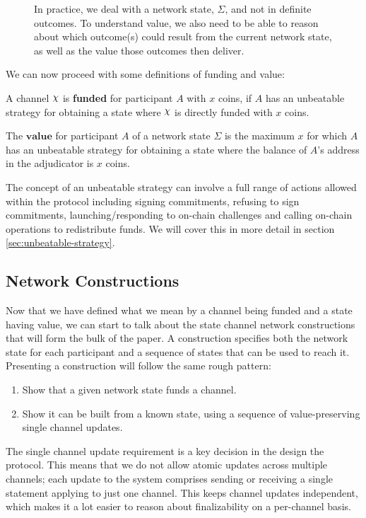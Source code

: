 \begin{figure}[h]\centering
  \makebox[\textwidth][c]{}
  \caption{
    In practice, we deal with a network state, $\Sigma$, and not in definite outcomes.
    To understand value, we also need to be able to reason about which outcome(s) could result from the current network state, as well as the value those outcomes then deliver.
  }\label{fig:system-state-direct-funding}
\end{figure}

We can now proceed with some definitions of funding and value:

A channel $\rchi$ is \textbf{funded} for participant $A$ with $x$ coins, if $A$ has an unbeatable strategy for obtaining a state where $\rchi$ is directly funded with $x$ coins.

The $\textbf{value}$ for participant $A$ of a network state $\Sigma$ is the maximum $x$ for which $A$ has an unbeatable strategy for obtaining a state where the balance of $A$'s address in the adjudicator is $x$ coins.

The concept of an unbeatable strategy can involve a full range of actions allowed within the protocol including signing commitments, refusing to sign commitments, launching/responding to on-chain challenges and calling on-chain operations to redistribute funds.
We will cover this in more detail in section \ref{sec:unbeatable-strategy}.

\subsection{Network Constructions}

Now that we have defined what we mean by a channel being funded and a state having value, we can start to talk about the state channel network constructions that will form the bulk of the paper.
A construction specifies both the network state for each participant and a sequence of states that can be used to reach it.
Presenting a construction will follow the same rough pattern:
\begin{enumerate}
  \item Show that a given network state funds a channel.
  \item Show it can be built from a known state, using a sequence of value-preserving single channel updates.
\end{enumerate}
The single channel update requirement is a key decision in the design the protocol.
This means that we do not allow atomic updates across multiple channels;
each update to the system comprises sending or receiving a single statement applying to just one channel.
This keeps channel updates independent, which makes it a lot easier to reason about finalizability on a per-channel basis.

